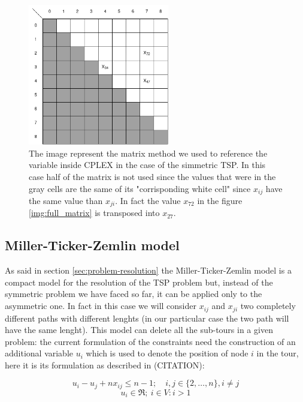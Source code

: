 \begin{figure}[h]
	\centering
	\includegraphics[width=0.55\textwidth]{images/full_matrix_simmetric}
	\caption{The image represent the matrix method we used to reference the variable inside CPLEX in the case of the simmetric TSP. In this case half of the matrix is not used since the values that were in the gray cells are the same of its "corrisponding white cell" since $x_{ij}$ have the same value than $x_{ji}$. In fact the value $x_{72}$ in the figure \ref{img:full_matrix} is transposed into $x_{27}$.}
	\label{img:full_matrix_simm}
\end{figure}

\subsection{Miller-Ticker-Zemlin model}
As said in section \ref{sec:problem-resolution} the Miller-Ticker-Zemlin model is a compact model for the resolution of the TSP problem but, instead of the symmetric problem we have faced so far, it can be applied only to the asymmetric one. In fact in this case we will consider $x_{ij}$ and $x_{ji}$ two completely different paths with different lenghts (in our particular case the two path will have the same lenght). This model can delete all the sub-tours in a given problem: the current formulation of the constraints need the construction of an additional variable $u_i$ which is used to denote the position of node $i$ in the tour, here it is its formulation as described in (CITATION):

\begin{equation}
\label{eqn:big-m}
	u_i-u_j+nx_{ij}\le n-1; \quad i,j\in \{2, \dots, n\}, i \not= j
\end{equation}
\begin{equation}
	\label{eqn:u-bound}
	u_i \in \Re; \: i \in V:i>1
\end{equation}

